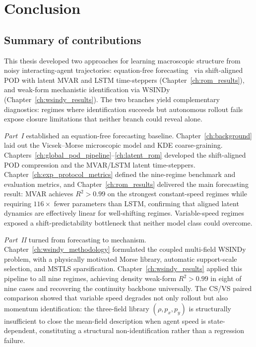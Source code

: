 \chapter{Conclusion}
\label{ch:conclusion}

\section{Summary of contributions}

This thesis developed two approaches for learning macroscopic structure
from noisy interacting-agent trajectories: equation-free
forecasting~\cite{alvarez2025eqfree} via shift-aligned POD with latent
MVAR and LSTM time-steppers (Chapter~\ref{ch:rom_results}), and
weak-form mechanistic identification via
WSINDy~\cite{messenger2021wsindy} (Chapter~\ref{ch:wsindy_results}).
The two branches yield complementary diagnostics: regimes where
identification succeeds but autonomous rollout fails expose closure
limitations that neither branch could reveal alone.

\emph{Part~I} established an equation-free forecasting baseline.
Chapter~\ref{ch:background} laid out the Vicsek--Morse microscopic model
and KDE coarse-graining.
Chapters~\ref{ch:global_pod_pipeline}--\ref{ch:latent_rom} developed the
shift-aligned POD compression and the MVAR/LSTM latent time-steppers.
Chapter~\ref{ch:exp_protocol_metrics} defined the nine-regime benchmark
and evaluation metrics, and Chapter~\ref{ch:rom_results} delivered the
main forecasting result: MVAR achieves $R^2>0.99$ on the strongest
constant-speed regimes while requiring $116\times$ fewer parameters than
LSTM, confirming that aligned latent dynamics are effectively linear for
well-shifting regimes.  Variable-speed regimes exposed a
shift-predictability bottleneck that neither model class could overcome.

\emph{Part~II} turned from forecasting to mechanism.
Chapter~\ref{ch:wsindy_methodology} formulated the coupled multi-field
WSINDy problem, with a physically motivated Morse library, automatic
support-scale selection, and MSTLS sparsification.
Chapter~\ref{ch:wsindy_results} applied this pipeline to all nine
regimes, achieving density weak-form $R^2>0.99$ in eight of nine cases
and recovering the continuity backbone universally.  The CS/VS paired
comparison showed that variable speed degrades not only rollout but
also momentum identification: the three-field library
$(\rho,p_x,p_y)$ is structurally insufficient to close the mean-field
description when agent speed is state-dependent, constituting a
structural non-identification rather than a regression failure.

